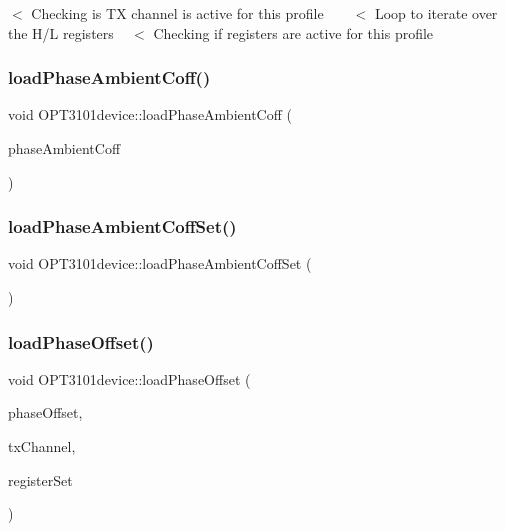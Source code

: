 $<$ Checking is TX channel is active for this profile ~\newline
~\newline
 $<$ Loop to iterate over the H/L registers ~\newline
 $<$ Checking if registers are active for this profile \mbox{\label{class_o_p_t3101device_a58c9087de66fea64ac3ab69fc6a37288}} 
\subsubsection{\texorpdfstring{load\+Phase\+Ambient\+Coff()}{loadPhaseAmbientCoff()}}
{\footnotesize\ttfamily void O\+P\+T3101device\+::load\+Phase\+Ambient\+Coff (\begin{DoxyParamCaption}\item[{\mbox{\hyperlink{class_o_p_t3101phase_ambient_coff}{O\+P\+T3101phase\+Ambient\+Coff}} $\ast$}]{phase\+Ambient\+Coff }\end{DoxyParamCaption})}

\mbox{\label{class_o_p_t3101device_aa4cf1fb930424717a4e7fb969b68bde6}} 
\subsubsection{\texorpdfstring{load\+Phase\+Ambient\+Coff\+Set()}{loadPhaseAmbientCoffSet()}}
{\footnotesize\ttfamily void O\+P\+T3101device\+::load\+Phase\+Ambient\+Coff\+Set (\begin{DoxyParamCaption}\item[{void}]{ }\end{DoxyParamCaption})}

\mbox{\label{class_o_p_t3101device_af5b25dc0fd4829e7027e724ee16cc059}} 
\subsubsection{\texorpdfstring{load\+Phase\+Offset()}{loadPhaseOffset()}}
{\footnotesize\ttfamily void O\+P\+T3101device\+::load\+Phase\+Offset (\begin{DoxyParamCaption}\item[{\mbox{\hyperlink{class_o_p_t3101_1_1phase_offset_c}{O\+P\+T3101\+::phase\+OffsetC}} $\ast$}]{phase\+Offset,  }\item[{uint8\+\_\+t}]{tx\+Channel,  }\item[{char}]{register\+Set }\end{DoxyParamCaption})}

